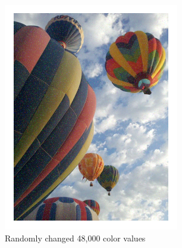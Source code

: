 \begin{figure}[ht]
\begin{minipage}[b]{0.45\linewidth}
	\includegraphics[width=\textwidth]{figures/noisy_balloons.pdf}
	\caption*{Randomly changed 48,000 color values}
	\end{minipage}
	\begin{minipage}[b]{0.45\linewidth}
	\centering

\end{minipage}
\end{figure}
